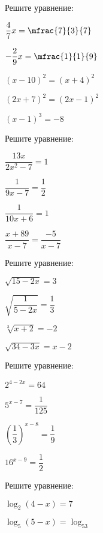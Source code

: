 %
%
%
%
\begin{class}[number=1]
	\begin{listofex}
		\item Решите уравнение:
		\begin{enumcols}[itemcolumns=3]
			\item \( \dfrac{4}{7}x=\mfrac{7}{3}{7} \)
			\item \( -\dfrac{2}{9}x=\mfrac{1}{1}{9} \)
			\item \( (x-10)^2=(x+4)^2 \)
			\item \( (2x+7)^2=(2x-1)^2 \)
			\item \( (x-1)^3=-8 \)
		\end{enumcols}
		\item Решите уравнение:
		\begin{enumcols}[itemcolumns=4]
			\item \( \dfrac{13x}{2x^2-7}=1 \)
			\item \( \dfrac{1}{9x-7}=\dfrac{1}{2} \)
			\item \( \dfrac{1}{10x+6}=1 \)
			\item \( \dfrac{x+89}{x-7}=\dfrac{-5}{x-7} \)
		\end{enumcols}
		\item Решите уравнение:
		\begin{enumcols}[itemcolumns=2]
			\item \( \sqrt{15-2x}=3 \)
			\item \( \sqrt{\dfrac{1}{5-2x}}=\dfrac{1}{3} \)
			\item \( \sqrt[3]{x+2}=-2 \)
			\item \( \sqrt{34-3x}=x-2 \)
		\end{enumcols}
		\item Решите уравнение:
		\begin{enumcols}[itemcolumns=4]
			\item \( 2^{4-2x}=64 \)
			\item \( 5^{x-7}=\dfrac{1}{125} \)
			\item \( \left(  \dfrac{1}{3}   \right)^{x-8}=\dfrac{1}{9}\)
			\item \( 16^{x-9}=\dfrac{1}{2} \)
		\end{enumcols}
		\item Решите уравнение:
		\begin{enumcols}[itemcolumns=2]
			\item \( \log_2(4-x)=7 \)
			\item \( \log_5(5-x)=\log_53 \)

\end{enumcols}
\end{listofex}
\end{class}
